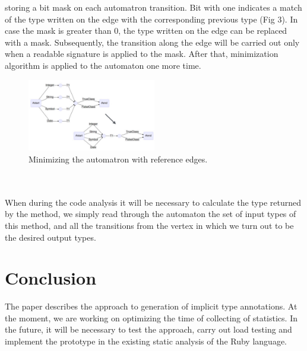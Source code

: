 \documentclass[conference]{IEEEtran}
\begin{document}
storing a bit mask on each automatron transition. Bit with one indicates a match of the type written on the edge with
the corresponding previous type (Fig 3). In case the mask is greater than 0, the type written on the edge can be
replaced with a mask. Subsequently, the transition along the edge will be carried out only when a readable signature is
applied to the mask. After that, minimization algorithm is applied to the automaton one more time.
\begin{figure}[h]
    \centering
    \includegraphics[width=0.5\textwidth]{img5}
    \caption{Minimizing the automatron with reference edges.}
\end{figure}
\\
\\
When during the code analysis it will be necessary to calculate the type returned by the method, we simply read through
the automaton the set of input types of this method, and all the transitions from the vertex in which we turn out to be
the desired output types.
\section{Conclusion}
The paper describes the approach to generation of implicit type annotations. At the moment, we are working on optimizing
the time of collecting of statistics. In the future, it will be necessary to test the approach, carry out load testing
and implement the prototype in the existing static analysis of the Ruby language.



\end{document}
